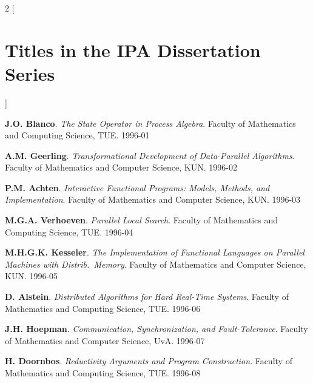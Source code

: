%
%
%
%
%
%
%
%


\newcommand*{\promitem}[4]{\noindent \textbf{#1}. \emph{#2}. #3.
#4\medskip}

\clearpage
\pagestyle{empty}

\footnotesize
\setlength{\columnsep}{2em}
\begin{multicols}{2}
        [\section*{Titles in the IPA Dissertation Series}]

\promitem{J.O. Blanco}
         {The State Operator in Process Algebra}
         {Faculty of Mathematics and Computing Science, TUE}
         {1996-01}

\promitem{A.M. Geerling}
         {Transformational Development of Data-Parallel Algorithms}
         {Faculty of Mathematics and Computer Science, KUN}
         {1996-02}

\promitem{P.M. Achten}
         {Interactive Functional Programs: Models, Methods, and
Implementation}
         {Faculty of Mathematics and Computer Science, KUN}
         {1996-03}

\promitem{M.G.A. Verhoeven}
         {Parallel Local Search}
         {Faculty of Mathematics and Computing Science, TUE}
         {1996-04}

\promitem{M.H.G.K. Kesseler}
         {The Implementation of Functional Languages on Parallel
Machines with Distrib.\ Memory}
         {Faculty of Mathematics and Computer Science, KUN}
         {1996-05}

\promitem{D. Alstein}
         {Distributed Algorithms for Hard Real-Time Systems}
         {Faculty of Mathematics and Computing Science, TUE}
         {1996-06}

\promitem{J.H. Hoepman}
         {Communication, Synchronization, and Fault-Tolerance}
         {Faculty of Mathematics and Computer Science, UvA}
         {1996-07}

\promitem{H. Doornbos}
         {Reductivity Arguments and Program Construction}
         {Faculty of Mathematics and Computing Science, TUE}
         {1996-08}


\end{multicols}
